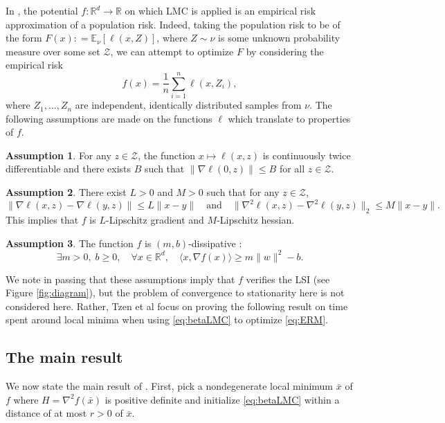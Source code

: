 \documentclass[10pt,journal,a4paper]{IEEEtran}
\theoremstyle{definition}
\newtheorem{assumption}{Assumption}
\newcommand{\E}{\mathbb{E}}
\newcommand{\R}{\mathbb{R}}
\begin{document}
In \cite{tzen_local_2018}, the potential $f: \R^d \rightarrow \R$ on which LMC is applied is an empirical risk approximation of a population risk. Indeed, taking the population risk to be of the form
\(
F(x) : = \E_\nu [\ell(x, Z)]
\), where $Z \sim \nu$ is some unknown probability measure over some set $\mathcal{Z}$, we can attempt to optimize $F$ by considering the empirical risk
\begin{equation}
f(x) = \frac{1}{n} \sum_{i=1}^{n}\ell(x, Z_i),
\label{eq:ERM}
\end{equation}
where $Z_1, \dots, Z_n$ are independent, identically distributed samples from $\nu$. The following assumptions are made on the functions $\ell$ which translate to properties of $f$.
\begin{assumption}
  For any $z \in \mathcal{Z}$, the function $x \mapsto \ell(x, z)$ is continuously twice differentiable and there exists $B$ such that $\| \nabla \ell (0, z) \| \leq B$ for all $z \in \mathcal{Z}$.
\end{assumption}
\begin{assumption}
  There exist $L > 0$ and $M> 0$ such that for any $z \in \mathcal{Z}$,
  \[
  \| \nabla \ell(x, z) - \nabla \ell(y, z)\| \leq L \|x - y\| \quad \text{and} \quad \| \nabla^2 \ell(x, z) - \nabla^2 \ell(y, z)\|_2 \leq M \|x - y\|.
  \]
  This implies that $f$ is $L$-Lipschitz gradient and $M$-Lipschitz hessian.
\end{assumption}
\begin{assumption}
  The function $f$ is $(m, b)$-dissipative :
  \[
  \exists m>0, \; b\geq 0, \quad \forall x \in \R^d, \quad \langle x, \nabla f(x) \rangle \geq m \|w\|^2 - b.
  \]
\end{assumption}

We note in passing that these assumptions imply that $f$ verifies the LSI (see Figure \ref{fig:diagram}), but the problem of convergence to stationarity here is not considered here. Rather, Tzen et al focus on proving the following result on time spent around local minima when using \eqref{eq:betaLMC} to optimize \eqref{eq:ERM}.

\subsection{The main result}

We now state the main result of \cite{tzen_local_2018}. First, pick a nondegenerate local minimum $\bar{x}$ of $f$ where $H = \nabla^2f(\bar{x})$ is positive definite and initialize \eqref{eq:betaLMC} within a distance of at most $r > 0$ of $\bar{x}$. 
\end{document}
